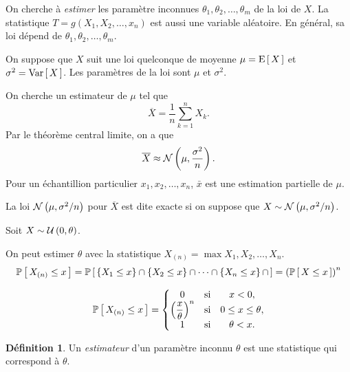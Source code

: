 \documentclass[11pt]{article}
\makeatletter
\renewcommand\P[1]{%
	\ensuremath{%
		\mathbb{P}\left[\,#1\,\right]%
	}%
}%
\newcommand\Uni[2]{%
	\ensuremath{%
		\mathcal{U}\left(#1,#2\right)%
	}%
}%
\newcommand\Norm[2]{%
	\ensuremath{%
		\mathcal{N}\left(#1,#2\right)%
	}%
}%
\newcommand\Esp[1]{%
	\ensuremath{%
		\mathrm{E}\left[\,#1\,\right]%
	}%
}%
\newcommand\Var[1]{%
	\ensuremath{%
		\mathrm{Var}\left[\,#1\,\right]%
	}%
}%
\theoremstyle{remark}
\theoremstyle{definition}
\newtheorem*{@definition}{Définition}
\newenvironment{definition}{%
	\begin{@definition}%
}{%
	\end{@definition}%
	\setcounter{property}{0}%
}
\makeatother
\begin{document}
On cherche à \textit{estimer} les paramètre inconnues $\theta_1,\theta_2,\dots,
\theta_m$ de la loi de $X$. La statistique $T=g(X_1,X_2,\dots,x_n)$ est aussi
une variable aléatoire. En général, sa loi dépend de $\theta_1,\theta_2,\dots,\theta_m$.

\begin{exemple}
	On suppose que $X$ suit une loi quelconque de moyenne $\mu=\Esp{X}$ et
	$\sigma^2=\Var{X}$. Les paramètres de la loi sont $\mu$ et $\sigma^2$.

	On cherche un estimateur de $\mu$ tel que
	\begin{equation*}
		\overline{X}
		=\frac{1}{n}\sum_{k=1}^nX_k.
	\end{equation*}
	Par le théorème central limite, on a que
	\begin{equation*}
		\overline{X}
		\approx\Norm{\mu}{\frac{\sigma^2}{n}}.
	\end{equation*}
	Pour un échantillion particulier $x_1,x_2,\dots,x_n$, $\bar{x}$ est une
	estimation partielle de $\mu$.

	La loi $\Norm{\mu}{\sigma^2/n}$ pour $\overline{X}$ est dite exacte si on
	suppose que $X\sim\Norm{\mu}{\sigma^2/n}$.
\end{exemple}

\begin{exemple}
	Soit $X\sim\Uni{0}{\theta}$.

	On peut estimer $\theta$ avec la statistique $X_{(n)}=\max{X_1,X_2,\dots,
	X_n}$.
	\begin{equation*}
		\P{X_{(n)}\leq x}
		=\P{
			\left\{X_1\leq x\right\}\cap
			\left\{X_2\leq x\right\}\cap
			\cdots\cap
			\left\{X_n\leq x\right\}\cap}
		=\left(\P{X\leq x}\right)^n
	\end{equation*}

	\begin{equation*}
		\P{X_{(n)}\leq x}
		=\left\{
			\begin{matrix}
				0 & \text{si} & x<0,\\
				\left(\dfrac{x}{\theta}\right)^n 
				  & \text{si} & 0\leq x\leq\theta,\\
				1 & \text{si} & \theta<x.\\
			\end{matrix}
		\right.
	\end{equation*}
\end{exemple}

\begin{definition}
	Un \textit{estimateur} d'un paramètre inconnu $\theta$ est une statistique
	qui correspond à $\theta$.
\end{definition}
\end{document}
